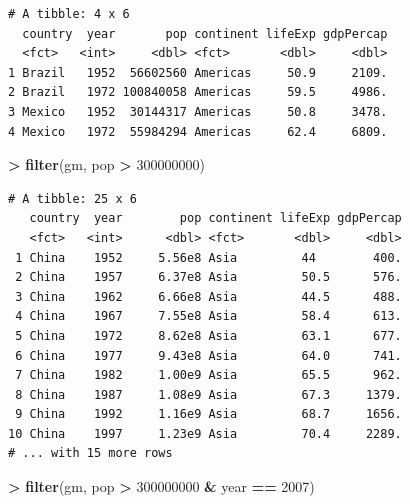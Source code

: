 \documentclass[]{krantz}
\makeatletter
\newenvironment{Shaded}{\begin{snugshade}}{\end{snugshade}}
\newcommand{\KeywordTok}[1]{\textcolor[rgb]{0.27,0.27,0.27}{\textbf{#1}}}
\newcommand{\DecValTok}[1]{\textcolor[rgb]{0.06,0.06,0.06}{#1}}
\newcommand{\StringTok}[1]{\textcolor[rgb]{0.5,0.5,0.5}{#1}}
\newcommand{\OperatorTok}[1]{\textcolor[rgb]{0.43,0.43,0.43}{\textbf{#1}}}
\newcommand{\NormalTok}[1]{#1}
\newenvironment{kframe}{%
\medskip{}
\setlength{\fboxsep}{.8em}
 \def\at@end@of@kframe{}%
 \ifinner\ifhmode%
  \def\at@end@of@kframe{\end{minipage}}%
  \begin{minipage}{\columnwidth}%
 \fi\fi%
 \def\FrameCommand##1{\hskip\@totalleftmargin \hskip-\fboxsep
 \colorbox{shadecolor}{##1}\hskip-\fboxsep
     \hskip-\linewidth \hskip-\@totalleftmargin \hskip\columnwidth}%
 \MakeFramed {\advance\hsize-\width
   \@totalleftmargin\z@ \linewidth\hsize
   \@setminipage}}%
 {\par\unskip\endMakeFramed%
 \at@end@of@kframe}
\renewenvironment{Shaded}{\begin{kframe}}{\end{kframe}}
\makeatother
\begin{document}
\begin{Shaded}
\end{Shaded}

\begin{verbatim}
# A tibble: 4 x 6
  country  year       pop continent lifeExp gdpPercap
  <fct>   <int>     <dbl> <fct>       <dbl>     <dbl>
1 Brazil   1952  56602560 Americas     50.9     2109.
2 Brazil   1972 100840058 Americas     59.5     4986.
3 Mexico   1952  30144317 Americas     50.8     3478.
4 Mexico   1972  55984294 Americas     62.4     6809.
\end{verbatim}

\begin{Shaded}
\begin{Highlighting}[]
\OperatorTok{>}\StringTok{ }\KeywordTok{filter}\NormalTok{(gm, pop }\OperatorTok{>}\StringTok{ }\DecValTok{300000000}\NormalTok{)}
\end{Highlighting}
\end{Shaded}

\begin{verbatim}
# A tibble: 25 x 6
   country  year        pop continent lifeExp gdpPercap
   <fct>   <int>      <dbl> <fct>       <dbl>     <dbl>
 1 China    1952     5.56e8 Asia         44        400.
 2 China    1957     6.37e8 Asia         50.5      576.
 3 China    1962     6.66e8 Asia         44.5      488.
 4 China    1967     7.55e8 Asia         58.4      613.
 5 China    1972     8.62e8 Asia         63.1      677.
 6 China    1977     9.43e8 Asia         64.0      741.
 7 China    1982     1.00e9 Asia         65.5      962.
 8 China    1987     1.08e9 Asia         67.3     1379.
 9 China    1992     1.16e9 Asia         68.7     1656.
10 China    1997     1.23e9 Asia         70.4     2289.
# ... with 15 more rows
\end{verbatim}

\begin{Shaded}
\begin{Highlighting}[]
\OperatorTok{>}\StringTok{ }\KeywordTok{filter}\NormalTok{(gm, pop }\OperatorTok{>}\StringTok{ }\DecValTok{300000000} \OperatorTok{&}\StringTok{ }\NormalTok{year }\OperatorTok{==}\StringTok{ }\DecValTok{2007}\NormalTok{)}
\end{Highlighting}
\end{Shaded}
\end{document}
